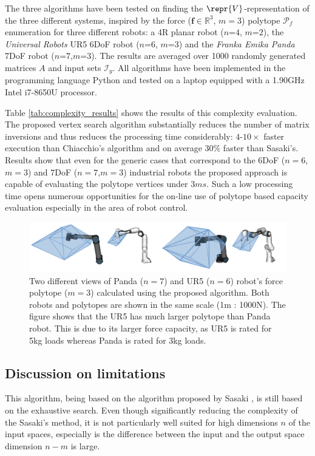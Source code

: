 
The three algorithms have been tested on finding the $\repr{V}$-representation of the three different systems, inspired by the force ($\bm{f}\in\mathbb{R}^3$, $m=3$) polytope $\mathcal{P}_f$ enumeration for three different robots: a 4R planar robot ($n$=$4$, $m$=$2$), the \textit{Universal Robots} UR5 6DoF robot ($n$=$6$, $m$=$3$) and the \textit{Franka Emika Panda} 7DoF robot ($n$=$7$,$m$=$3$). The results are averaged over 1000 randomly generated matrices $A$ and input sets $\mathcal{I}_y$. All algorithms have been implemented in the programming language Python and tested on a laptop equipped with a 1.90GHz Intel i7-8650U processor. 

Table \ref{tab:complexity_results} shows the results of this complexity evaluation. The proposed vertex search algorithm substantially reduces the number of matrix inversions and thus reduces the processing time considerably: $4$-$10\times$ faster execution than Chiacchio's algorithm and on average 30\% faster than Sasaki's. Results show that even for the generic cases that correspond to the 6DoF ($n=6$,$m=3$) and 7DoF ($n=7$,$m=3$) industrial robots the proposed approach is capable of evaluating the polytope vertices under $3ms$. Such a low processing time opens numerous opportunities for the on-line use of polytope based capacity evaluation especially in the area of robot control.

\begin{figure}
    \centering
    \includegraphics[width=\linewidth]{Papers/images/panda_ur5.png}
    \caption{Two different views of Panda ($n=7$) and UR5 ($n=6$) robot's force polytope ($m=3$) calculated using the proposed algorithm. Both robots and polytopes are shown in the same scale (1m : 1000N). The figure shows that the UR5 has much larger polytope than Panda robot. This is due to its larger force capacity, as UR5 is rated for 5kg loads whereas Panda is rated for 3kg loads.}
    \label{fig:panda_ur5_force}
\end{figure}

\subsection{Discussion on limitations}
This algorithm, being based on the algorithm proposed by Sasaki \cite{sasaki2011vertex}, is still based on the exhaustive search. Even though significantly reducing the complexity of the Sasaki's method, it is not particularly well suited for high dimensions $n$ of the input spaces, especially is the difference between the input and the output space dimension $n\!-\!m$ is large. 

